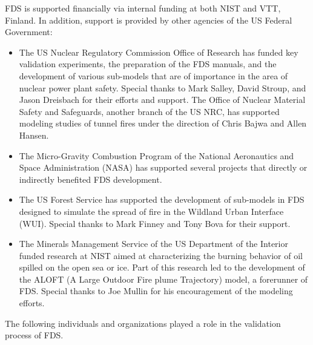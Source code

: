 \documentclass[11pt]{book}
\begin{document}
FDS is supported financially via internal funding at both NIST and
VTT, Finland. In addition, support is provided by other agencies of
the US Federal Government:
\begin{itemize}
\item The US Nuclear Regulatory Commission Office of Research has funded key
validation experiments, the preparation of the FDS manuals, and the
development of various sub-models that are of importance in the area
of nuclear power plant safety. Special thanks to Mark Salley, David Stroup, and Jason
Dreisbach for their efforts and support.  The Office of Nuclear
Material Safety and Safeguards, another branch of the US NRC, has
supported modeling studies of tunnel fires under the direction of
Chris Bajwa and Allen Hansen.
\item The Micro-Gravity Combustion Program of the National Aeronautics and Space
Administration (NASA) has supported several projects that directly or indirectly benefited FDS development.
\item The US Forest Service has supported the development of sub-models in FDS designed to simulate the spread of
fire in the Wildland Urban Interface (WUI). Special thanks to Mark Finney and Tony Bova for their support.
\item The Minerals Management Service of the US Department of the Interior funded research at NIST aimed at
characterizing the burning behavior of oil spilled on the open sea or ice. Part of this research led to the development
of the ALOFT (A Large Outdoor Fire plume Trajectory) model, a forerunner of FDS. Special thanks to Joe Mullin for his
encouragement of the modeling efforts.
\end{itemize}
\noindent The following individuals and organizations played a role in the validation process of FDS.
\end{document}
